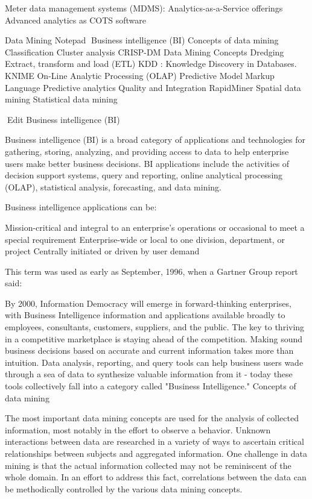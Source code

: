 Meter data management systems (MDMS):
Analytics-as-a-Service offerings
Advanced analytics as COTS software

\newpage


Data Mining Notepad
Business intelligence (BI)
Concepts of data mining
Classification
Cluster analysis
CRISP-DM
Data Mining Concepts
Dredging
Extract, transform and load (ETL)
KDD : Knowledge Discovery in Databases.
KNIME
On-Line Analytic Processing (OLAP)
Predictive Model Markup Language
Predictive analytics
Quality and Integration
RapidMiner
Spatial data mining
Statistical data mining

Edit
Business intelligence (BI) 

Business intelligence (BI) is a broad category of applications and technologies for gathering, storing, analyzing, and providing access to data to help enterprise users make better business decisions. BI applications include the activities of decision support systems, query and reporting, online analytical processing (OLAP), statistical analysis, forecasting, and data mining.

Business intelligence applications can be:

Mission-critical and integral to an enterprise's operations or occasional to meet a special requirement
Enterprise-wide or local to one division, department, or project
Centrally initiated or driven by user demand

This term was used as early as September, 1996, when a Gartner Group report said:

By 2000, Information Democracy will emerge in forward-thinking enterprises, with Business Intelligence information and applications available broadly to employees, consultants, customers, suppliers, and the public. The key to thriving in a competitive marketplace is staying ahead of the competition. Making sound business decisions based on accurate and current information takes more than intuition. Data analysis, reporting, and query tools can help business users wade through a sea of data to synthesize valuable information from it - today these tools collectively fall into a category called "Business Intelligence."
Concepts of data mining

The most important data mining concepts are used for the analysis of collected information, most notably in the effort to observe a behavior. Unknown interactions between data are researched in a variety of ways to ascertain critical relationships between subjects and aggregated information. One challenge in data mining is that the actual information collected may not be reminiscent of the whole domain. In an effort to address this fact, correlations between the data can be methodically controlled by the various data mining concepts.

